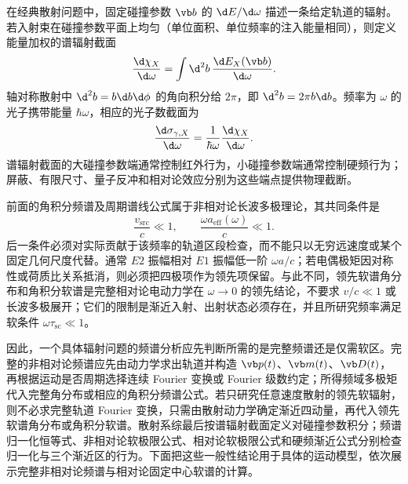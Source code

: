 在经典散射问题中，固定碰撞参数 $\vb b$ 的 $\d E/\d\omega$ 描述一条给定轨道的辐射。若入射束在碰撞参数平面上均匀（单位面积、单位频率的注入能量相同），则定义能量加权的谱辐射截面
\begin{equation*}
	\frac{\d\chi_X}{\d\omega}
	=\int\d^2b\,\frac{\d E_X(\vb b)}{\d\omega}.
\end{equation*}
轴对称散射中 $\d^2b=b\d b\d\phi$ 的角向积分给 $2\pi$，即 $\d^2b=2\pi b\d b$。频率为 $\omega$ 的光子携带能量 $\hbar\omega$，相应的光子数截面为
\begin{equation*}
	\frac{\d\sigma_{\gamma,X}}{\d\omega}
	=\frac{1}{\hbar\omega}\frac{\d\chi_X}{\d\omega}.
\end{equation*}
谱辐射截面的大碰撞参数端通常控制红外行为，小碰撞参数端通常控制硬频行为；屏蔽、有限尺寸、量子反冲和相对论效应分别为这些端点提供物理截断。

前面的角积分频谱及周期谱线公式属于非相对论长波多极理论，其共同条件是
\begin{equation*}
	\frac{v_{\mathrm{src}}}{c}\ll1,
	\qquad
	\frac{\omega a_{\mathrm{eff}}(\omega)}{c}\ll1.
\end{equation*}
后一条件必须对实际贡献于该频率的轨道区段检查，而不能只以无穷远速度或某个固定几何尺度代替。通常 $E2$ 振幅相对 $E1$ 振幅低一阶 $\omega a/c$；若电偶极矩因对称性或荷质比关系抵消，则必须把四极项作为领先项保留。与此不同，领先软谱角分布和角积分软谱是完整相对论电动力学在 $\omega\to0$ 的领先结论，不要求 $v/c\ll1$ 或长波多极展开；它们的限制是渐近入射、出射状态必须存在，并且所研究频率满足软条件 $\omega\tau_{\mathrm{sc}}\ll1$。

因此，一个具体辐射问题的频谱分析应先判断所需的是完整频谱还是仅需软区。完整的非相对论频谱应先由动力学求出轨道并构造 $\vb p(t)$、$\vb m(t)$、$\vb D(t)$，再根据运动是否周期选择连续 Fourier 变换或 Fourier 级数约定；所得频域多极矩代入完整角分布或相应的角积分频谱公式。若只研究任意速度散射的领先软辐射，则不必求完整轨道 Fourier 变换，只需由散射动力学确定渐近四动量，再代入领先软谱角分布或角积分软谱。散射系综最后按谱辐射截面定义对碰撞参数积分；频谱归一化恒等式、非相对论软极限公式、相对论软极限公式和硬频渐近公式分别检查归一化与三个渐近区的行为。下面把这些一般性结论用于具体的运动模型，依次展示完整非相对论频谱与相对论固定中心软谱的计算。
